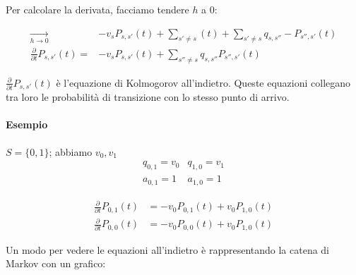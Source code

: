 \documentclass[a4paper,12pt]{book}
\begin{document}
Per calcolare la derivata, facciamo tendere $ h $ a 0:

\begin{align*}
	\underset{h \to 0}{\longrightarrow} \qquad & -v_s P_{s,s'}(t) + \sum_{s' \ne s}(t) + \sum_{s' \ne s} q_{s,s''} - P_{s'',s'}(t) \\
	\frac{\partial}{\partial t} P_{s,s'}(t) = & -v_s P_{s,s'}(t) + \sum_{s'' \ne s} q_{s,s''} P_{s'',s'}(t) 
\end{align*}

$ \frac{\partial}{\partial t} P_{s,s'}(t) $ è l'equazione di Kolmogorov all'indietro. Queste equazioni collegano tra loro le probabilità di transizione con lo stesso punto di arrivo. 

\paragraph{Esempio} $ S = \{0,1\} $; abbiamo $ v_0, v_1 $
$$ \begin{array}{cc}
 	q_{0,1} = v_0 & q_{1,0} = v_1 \\
 	a_{0,1} = 1 & a_{1,0} = 1
\end{array} $$

\begin{align*}
	\frac{\partial}{\partial t} P_{0,1}(t) & = -v_0 P_{0,1}(t) + v_0 P_{1,0}(t) \\
	\frac{\partial}{\partial t} P_{0,0}(t) & = -v_0 P_{0,0}(t) + v_0 P_{1,0}(t) 
\end{align*} 

Un modo per vedere le equazioni all'indietro è rappresentando la catena di Markov con un grafico:
\begin{center}
\end{center}
\end{document}
